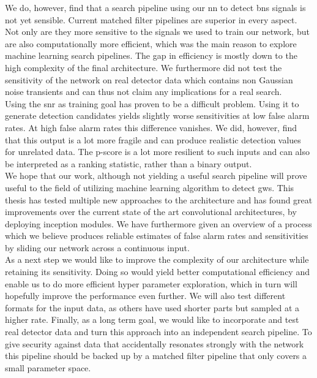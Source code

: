 We do, however, find that a search pipeline using our \gls{nn} to detect \gls{bns} signals is not yet sensible. Current matched filter pipelines are superior in every aspect. Not only are they more sensitive to the signals we used to train our network, but are also computationally more efficient, which was the main reason to explore machine learning search pipelines. The gap in efficiency is mostly down to the high complexity of the final architecture. We furthermore did not test the sensitivity of the network on real detector data which contains non Gaussian noise transients and can thus not claim any implications for a real search.\\
Using the \gls{snr} as training goal has proven to be a difficult problem. Using it to generate detection candidates yields slightly worse sensitivities at low false alarm rates. At high false alarm rates this difference vanishes. We did, however, find that this output is a lot more fragile and can produce realistic detection values for unrelated data. The p-score is a lot more resilient to such inputs and can also be interpreted as a ranking statistic, rather than a binary output.\\
We hope that our work, although not yielding a useful search pipeline will prove useful to the field of utilizing machine learning algorithm to detect \gls{gw}s. This thesis has tested multiple new approaches to the architecture and has found great improvements over the current state of the art convolutional architectures, by deploying inception modules. We have furthermore given an overview of a process which we believe produces reliable estimates of false alarm rates and sensitivities by sliding our network across a continuous input.\smallskip\\
As a next step we would like to improve the complexity of our architecture while retaining its sensitivity. Doing so would yield better computational efficiency and enable us to do more efficient hyper parameter exploration, which in turn will hopefully improve the performance even further. We will also test different formats for the input data, as others have used shorter parts but sampled at a higher rate. Finally, as a long term goal, we would like to incorporate and test real detector data and turn this approach into an independent search pipeline. To give security against data that accidentally resonates strongly with the network this pipeline should be backed up by a matched filter pipeline that only covers a small parameter space.
